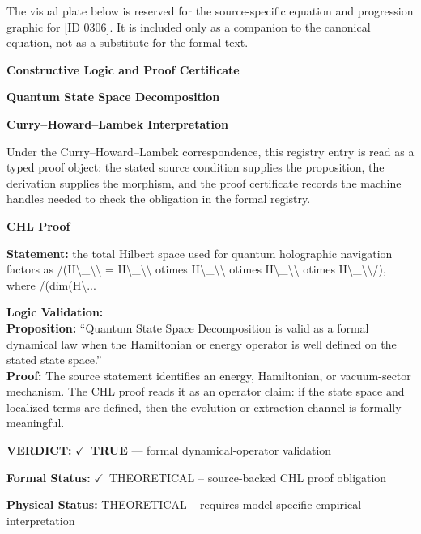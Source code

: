 \begingroup\footnotesize\sloppy
The visual plate below is reserved for the source-specific equation and progression graphic for [ID 0306]. It is included only as a companion to the canonical equation, not as a substitute for the formal text.
\par\endgroup
\ifTZPDarkEdition
{}
\fi

\clearpage
\begingroup\tzpsupportsetup
\noindent\textbf{\fontsize{10.8pt}{12.8pt}\selectfont [ID 0306] Constructive Logic and Proof Certificate}\par
\noindent\textbf{\fontsize{10pt}{12pt}\selectfont Quantum State Space Decomposition}\par
\vspace{0.45em}
\begingroup
\footnotesize
\setlength{\parskip}{0.22em}
\setlength{\parindent}{0pt}
\noindent\textbf{Curry--Howard--Lambek Interpretation}\par
Under the Curry--Howard--Lambek correspondence, this registry entry is read as a typed proof
object: the stated source condition supplies the proposition, the derivation supplies the
morphism, and the proof certificate records the machine handles needed to check the obligation
in the formal registry.

\vspace{0.45em}
\noindent\textbf{CHL Proof}\par
\textbf{Statement:} the total Hilbert space used for quantum holographic navigation factors as /(H\textbackslash{}\_\textbackslash{}\textbackslash{} =
H\textbackslash{}\_\textbackslash{}\textbackslash{} otimes H\textbackslash{}\_\textbackslash{}\textbackslash{} otimes H\textbackslash{}\_\textbackslash{}\textbackslash{} otimes H\textbackslash{}\_\textbackslash{}\textbackslash{}/), where /(dim(H\textbackslash{}...

\textbf{Logic Validation:}\\
\textbf{Proposition:} ``Quantum State Space Decomposition is valid as a formal dynamical law when the
Hamiltonian or energy operator is well defined on the stated state space.''\\
\textbf{Proof:} The source statement identifies an energy, Hamiltonian, or vacuum-sector mechanism. The
CHL proof reads it as an operator claim: if the state space and localized terms are
defined, then the evolution or extraction channel is formally meaningful.

\textbf{VERDICT:} \ensuremath{\checkmark}\ \textbf{TRUE} --- formal dynamical-operator validation

\textbf{Formal Status:} \ensuremath{\checkmark}\ THEORETICAL -- source-backed CHL proof obligation

\textbf{Physical Status:} THEORETICAL -- requires model-specific empirical interpretation
\par\vspace{0.45em}
\par
\ifTZPDarkEdition
{}
\fi
\endgroup
\endgroup

